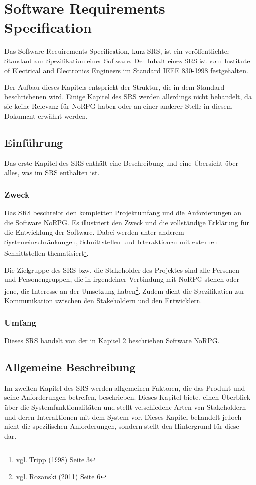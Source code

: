 \chapter{Software Requirements Specification}
	Das Software Requirements Specification, kurz SRS, ist ein veröffentlichter Standard zur Spezifikation einer Software. Der Inhalt eines SRS ist vom Institute of Electrical and Electronics Engineers im Standard IEEE 830-1998 festgehalten.
	
	Der Aufbau dieses Kapitels entspricht der Struktur, die in dem Standard beschriebenen wird. Einige Kapitel des SRS werden allerdings nicht behandelt, da sie keine Relevanz für NoRPG haben oder an einer anderer Stelle in diesem Dokument erwähnt werden.
	
\section{Einführung}
	Das erste Kapitel des SRS enthält eine Beschreibung und eine Übersicht über alles, was im SRS enthalten ist.
	
	\subsection{Zweck}
		Das SRS beschreibt den kompletten Projektumfang und die Anforderungen an die Software NoRPG. Es illustriert den Zweck und die vollständige Erklärung für die Entwicklung der Software. Dabei werden unter anderem Systemeinschränkungen, Schnittstellen und Interaktionen mit externen Schnittstellen thematisiert\footnote{vgl. Tripp \cite{srsIEEE}(1998) Seite 3}. 
	
		Die Zielgruppe des SRS bzw. die Stakeholder des Projektes sind alle Personen und Personengruppen, die in irgendeiner Verbindung mit NoRPG stehen oder jene, die Interesse an der Umsetzung haben\footnote{vgl. Rozanski \cite{rozanski2011}(2011) Seite 6}. Zudem dient die Spezifikation zur Kommunikation zwischen den Stakeholdern und den Entwicklern.
		
	\subsection{Umfang}
		Dieses SRS handelt von der in Kapitel 2 beschrieben Software NoRPG. 
		
\section{Allgemeine Beschreibung}
	Im zweiten Kapitel des SRS werden allgemeinen Faktoren, die das Produkt und seine Anforderungen betreffen, beschrieben. Dieses Kapitel bietet einen Überblick über die Systemfunktionalitäten und stellt verschiedene Arten von Stakeholdern und deren Interaktionen mit dem System vor. Dieses Kapitel behandelt jedoch nicht die spezifischen Anforderungen, sondern stellt den Hintergrund für diese dar. 

